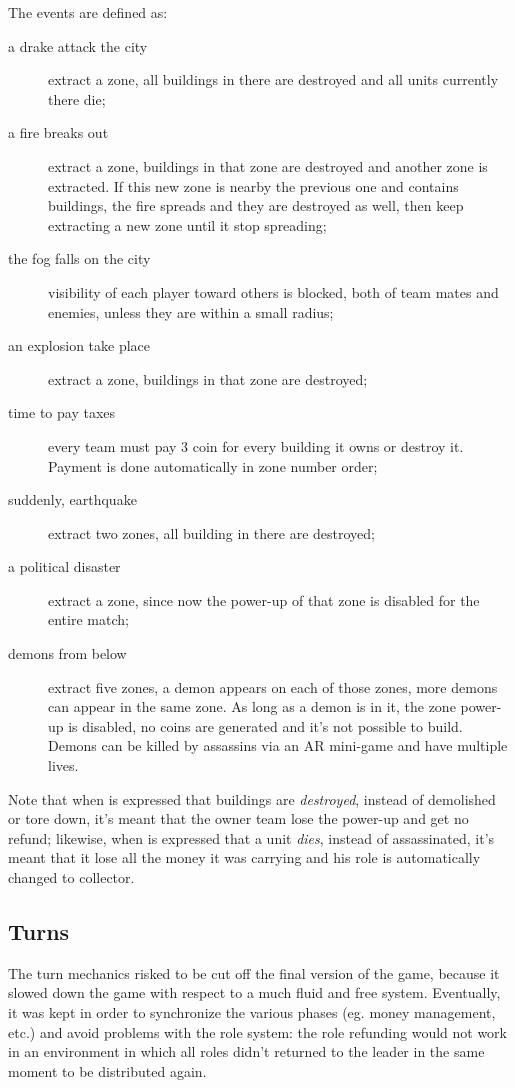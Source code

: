 			The events are defined as:
			\begin{description}
				\item[a drake attack the city] extract a zone, all buildings in there are destroyed and all units currently there die;
				\item[a fire breaks out] extract a zone, buildings in that zone are destroyed and another zone is extracted. If this new zone is nearby the previous one and contains buildings, the fire spreads and they are destroyed as well, then keep extracting a new zone until it stop spreading;
				\item[the fog falls on the city] visibility of each player toward others is blocked, both of team mates and enemies, unless they are within a small radius;
				\item[an explosion take place] extract a zone, buildings in that zone are destroyed;
				\item[time to pay taxes] every team must pay 3 coin for every building it owns or destroy it. Payment is done automatically in zone number order;
				\item[suddenly, earthquake] extract two zones, all building in there are destroyed;
				\item[a political disaster] extract a zone, since now the power-up of that zone is disabled for the entire match;
				\item[demons from below] extract five zones, a demon appears on each of those zones, more demons can appear in the same zone. As long as a demon is in it, the zone power-up is disabled, no coins are generated and it's not possible to build. Demons can be killed by assassins via an AR mini-game and have multiple lives.
			\end{description}
			
			Note that when is expressed that buildings are \emph{destroyed}, instead of demolished or tore down, it's meant that the owner team lose the power-up and get no refund; likewise, when is expressed that a unit \emph{dies}, instead of assassinated, it's meant that it lose all the money it was carrying and his role is automatically changed to collector.
			
			
		\subsection{Turns}
		
			The turn mechanics risked to be cut off the final version of the game, because it slowed down the game with respect to a much fluid and free system.
			Eventually, it was kept in order to synchronize the various phases (eg. money management, etc.) and avoid problems with the role system: the role refunding would not work in an environment in which all roles didn't returned to the leader in the same moment to be distributed again.
			
